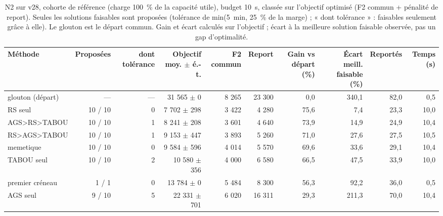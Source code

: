 \begin{table}[htbp]
\centering
\small
\caption{N2 sur v28, cohorte de référence (charge 100~\% de la capacité utile), budget 10~s, classée sur l'objectif optimisé (F2 commun + pénalité de report). Seules les solutions faisables sont proposées (tolérance de min(5~min, 25~\% de la marge) ; « dont tolérance » : faisables seulement grâce à elle). Le glouton est le départ commun. Gain et écart calculés sur l'objectif ; écart à la meilleure solution faisable observée, pas un gap d'optimalité.}
\label{tab:n2}
\begin{tabular}{lrrrrrrrrr}
\toprule
Méthode & Proposées & dont tolérance & Objectif moy. $\pm$ é.-t. & F2 commun & Report & Gain vs départ (\%) & Écart meill. faisable (\%) & Reportés & Temps (s) \\
\midrule
glouton (départ) & — & — & 31 565 $\pm$ 0 & 8 265 & 23 300 & 0,0 & 340,1 & 82,0 & 0,5 \\
RS seul & 10 / 10 & 0 & 7 702 $\pm$ 298 & 3 422 & 4 280 & 75,6 & 7,4 & 23,3 & 10,0 \\
AGS\textgreater{}RS\textgreater{}TABOU & 10 / 10 & 1 & 8 241 $\pm$ 208 & 3 601 & 4 640 & 73,9 & 14,9 & 24,9 & 10,4 \\
RS\textgreater{}AGS\textgreater{}TABOU & 10 / 10 & 1 & 9 153 $\pm$ 447 & 3 893 & 5 260 & 71,0 & 27,6 & 27,5 & 10,5 \\
memetique & 10 / 10 & 0 & 9 584 $\pm$ 596 & 4 014 & 5 570 & 69,6 & 33,6 & 29,1 & 10,4 \\
TABOU seul & 10 / 10 & 2 & 10 580 $\pm$ 356 & 4 000 & 6 580 & 66,5 & 47,5 & 33,9 & 10,0 \\
premier créneau & 1 / 1 & 0 & 13 784 $\pm$ 0 & 5 484 & 8 300 & 56,3 & 92,2 & 36,0 & 0,5 \\
AGS seul & 9 / 10 & 5 & 22 331 $\pm$ 701 & 6 020 & 16 311 & 29,3 & 211,3 & 70,0 & 10,4 \\
\bottomrule
\end{tabular}
\end{table}

